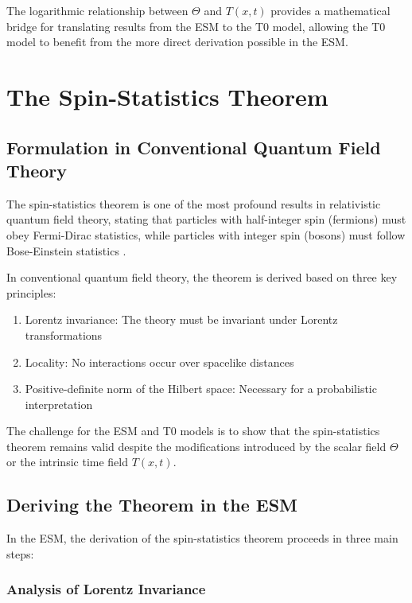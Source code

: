 \documentclass[12pt,a4paper]{article}
\newcommand{\Tfieldt}{T(x,t)}
\begin{document}
	The logarithmic relationship between $\Theta$ and $\Tfieldt$ provides a mathematical bridge for translating results from the ESM to the T0 model, allowing the T0 model to benefit from the more direct derivation possible in the ESM.
	
	\section{The Spin-Statistics Theorem}
	\label{sec:spin_statistics}
	
	\subsection{Formulation in Conventional Quantum Field Theory}
	\label{subsec:conventional_formulation}
	
	The spin-statistics theorem is one of the most profound results in relativistic quantum field theory, stating that particles with half-integer spin (fermions) must obey Fermi-Dirac statistics, while particles with integer spin (bosons) must follow Bose-Einstein statistics \cite{pauli1940}.
	
	In conventional quantum field theory, the theorem is derived based on three key principles:
	
	\begin{enumerate}
		\item Lorentz invariance: The theory must be invariant under Lorentz transformations
		\item Locality: No interactions occur over spacelike distances
		\item Positive-definite norm of the Hilbert space: Necessary for a probabilistic interpretation
	\end{enumerate}
	
	The challenge for the ESM and T0 models is to show that the spin-statistics theorem remains valid despite the modifications introduced by the scalar field $\Theta$ or the intrinsic time field $\Tfieldt$.
	
	\subsection{Deriving the Theorem in the ESM}
	\label{subsec:esm_derivation}
	
	In the ESM, the derivation of the spin-statistics theorem proceeds in three main steps:
	
	\subsubsection{Analysis of Lorentz Invariance}
	\label{subsubsec:lorentz_analysis}
	
\end{document}
